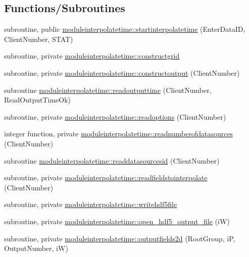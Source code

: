 \subsection*{Functions/\+Subroutines}
\begin{DoxyCompactItemize}
\item 
subroutine, public \mbox{\hyperlink{namespacemoduleinterpolatetime_a9ee23aab51e3ce1e657af4c8074b2ae2}{moduleinterpolatetime\+::startinterpolatetime}} (Enter\+Data\+ID, Client\+Number, S\+T\+AT)
\item 
subroutine, private \mbox{\hyperlink{namespacemoduleinterpolatetime_ae85e58c7f2328078eb15ab901ab2cec2}{moduleinterpolatetime\+::constructgrid}}
\item 
subroutine, private \mbox{\hyperlink{namespacemoduleinterpolatetime_af73c04e1fcd85cc293ad3c88c2420ff2}{moduleinterpolatetime\+::constructoutput}} (Client\+Number)
\item 
subroutine \mbox{\hyperlink{namespacemoduleinterpolatetime_a8c2cfcaa51773241235e7d16f6cb9e46}{moduleinterpolatetime\+::readoutputtime}} (Client\+Number, Read\+Output\+Time\+Ok)
\item 
subroutine, private \mbox{\hyperlink{namespacemoduleinterpolatetime_a37ac04a065528663fbfe37b1238128fd}{moduleinterpolatetime\+::readoptions}} (Client\+Number)
\item 
integer function, private \mbox{\hyperlink{namespacemoduleinterpolatetime_ad3414b04b75a8f0e9e8aaf053859dc2e}{moduleinterpolatetime\+::readnumberofdatasources}} (Client\+Number)
\item 
subroutine \mbox{\hyperlink{namespacemoduleinterpolatetime_ad261b036016fd92d9944eb5b6d0332b6}{moduleinterpolatetime\+::readdatasourcesid}} (Client\+Number)
\item 
subroutine, private \mbox{\hyperlink{namespacemoduleinterpolatetime_a75df12a5adb5a489b09f35e20b069242}{moduleinterpolatetime\+::readfieldstointerpolate}} (Client\+Number)
\item 
subroutine, private \mbox{\hyperlink{namespacemoduleinterpolatetime_aa6ef370ca77afaafd53df4bf43525f3d}{moduleinterpolatetime\+::writehdf5file}}
\item 
subroutine, private \mbox{\hyperlink{namespacemoduleinterpolatetime_af0bb28d64bc31ae488ca76a682f246f5}{moduleinterpolatetime\+::open\+\_\+hdf5\+\_\+output\+\_\+file}} (iW)
\item 
subroutine, private \mbox{\hyperlink{namespacemoduleinterpolatetime_a89452771fcee1960a251bf4fb95851c6}{moduleinterpolatetime\+::outputfields2d}} (Root\+Group, iP, Output\+Number, iW)

\end{DoxyCompactItemize}
